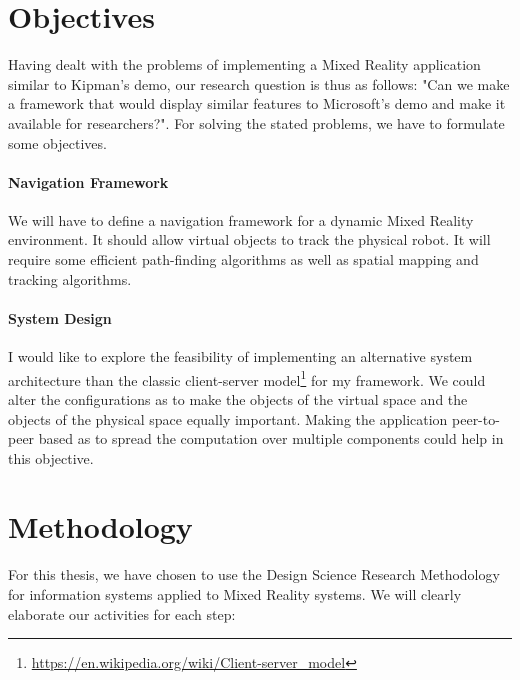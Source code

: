 \section{Objectives}
Having dealt with the problems of implementing a Mixed Reality application similar to Kipman's demo, our research question is thus as follows: "Can we make a framework that would display similar features to Microsoft's demo and make it available for researchers?". For solving the stated problems, we have to formulate some objectives.

\paragraph{Navigation Framework}
We will have to define a navigation framework for a dynamic Mixed Reality environment. It should allow virtual objects to track the physical robot. It will require some efficient path-finding algorithms as well as spatial mapping and tracking  algorithms. 

\paragraph{System Design}
I would like to explore the feasibility of implementing an alternative system architecture than the classic client-server model\footnote{\url{https://en.wikipedia.org/wiki/Client-server\_model}} for my framework. We could alter the configurations as to make the objects of the virtual space and the objects of the physical space equally important. Making the application peer-to-peer based as to spread the computation over multiple components could help in this objective.

\newpage
\section{Methodology}
For this thesis, we have chosen to use the Design Science Research Methodology for information systems applied to Mixed Reality systems\cite{peffers2007design}\relax. We will clearly elaborate our activities for each step:

